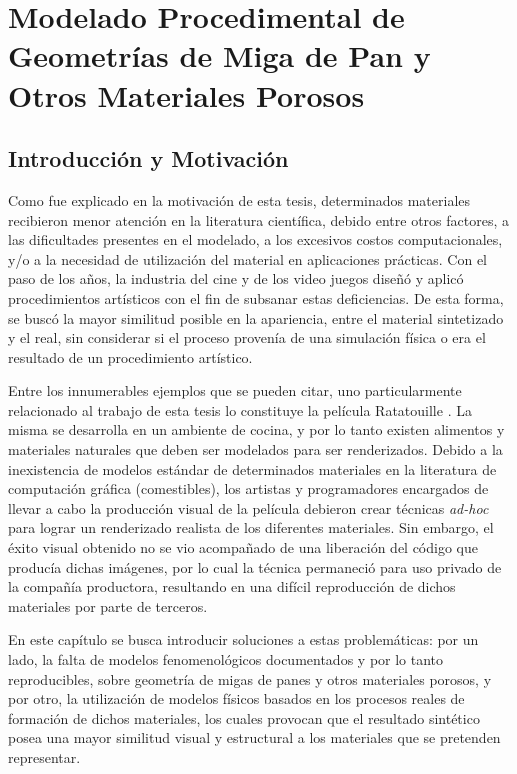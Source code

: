 \chapter[Modelado Procedimental de Geometrías Porosas]{Modelado Procedimental de Geometrías de Miga de Pan y Otros Materiales Porosos}

\section{Introducción y Motivación} %
Como fue explicado en la motivación de esta tesis, determinados materiales recibieron menor atención en la literatura científica, debido entre otros factores, a las dificultades presentes	 en el modelado, a los excesivos costos computacionales, y/o a la necesidad de utilización del material en aplicaciones prácticas.
Con el paso de los a\~nos, la industria del cine y de los video juegos diseñó y aplicó procedimientos artísticos con el fin de subsanar estas deficiencias.
De esta forma, se busc\'o la mayor similitud posible en la apariencia, entre el material sintetizado y el real, sin considerar si el proceso provenía de una simulación física o era el resultado de un procedimiento artístico.

Entre los innumerables ejemplos que se pueden citar, uno particularmente relacionado al trabajo de esta tesis lo constituye la película Ratatouille \cite{Cho2007}.
La misma se desarrolla en un ambiente de cocina, y por lo tanto existen alimentos y materiales naturales que deben ser modelados para ser renderizados.
Debido a la inexistencia de modelos estándar de determinados materiales en la literatura de computación gráfica (comestibles), los artistas y programadores encargados de llevar a cabo la producción visual de la película debieron crear técnicas {\em ad-hoc} para lograr un renderizado realista de los diferentes materiales.
Sin embargo, el éxito visual obtenido no se vio acompañado de una liberación del código que producía dichas imágenes, por lo cual la técnica permaneció para uso privado de la compañía productora, resultando en una difícil reproducción de dichos materiales por parte de terceros.

En este capítulo se busca introducir soluciones a estas problemáticas: por un lado, la falta de modelos fenomenológicos documentados y por lo tanto reproducibles, sobre geometría de migas de panes y otros materiales porosos, y por otro, la utilización de modelos físicos basados en los procesos reales de formación de dichos materiales, los cuales provocan que el resultado sintético posea una mayor similitud visual y estructural a los materiales que se pretenden representar.


